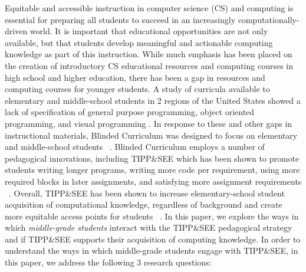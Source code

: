 \documentclass[sigconf,manuscript,review,anonymous]{acmart} %
\def\ts{TIPP\&SEE}
\newcommand{\Scratchencore}[0]{Blinded Curriculum}
\begin{document}
Equitable and accessible instruction in computer science (CS) and computing is essential for preparing all students to succeed in an increasingly computationally-driven world. It is important that educational opportunities are not only available, but that students develop meaningful and actionable computing knowledge as part of this instruction. While much emphasis has been placed on the creation of introductory CS educational resources and computing courses in high school and higher education, there has been a gap in resources and computing courses for younger students. %
A study of curricula available to elementary and middle-school students in 2 regions of the United States showed a lack of specification of general purpose programming, object oriented programming, and visual programming \cite{falkner2019international}. In response to these and other gaps in instructional materials, \Scratchencore{} was designed to focus on elementary and middle-school students ~\cite{authors}. \Scratchencore{} employs a number of pedagogical innovations, including \ts{} which has been shown to promote students writing longer programs, writing more code per requirement, using more required blocks in later assignments, and satisfying more assignment requirements ~\cite{10.1145/3372782.3406257}. Overall, \ts{} has been shown to increase elementary-school student acquisition of computational knowledge, regardless of background and create more equitable access points for students ~\cite{10.1145/3372782.3406257}. In this paper, we explore the ways in which \emph{middle-grade students} interact with the \ts{} pedagogical strategy and if \ts{} supports their acquisition of computing knowledge. In order to understand the ways in which middle-grade students engage with \ts{}, in this paper, we address the following 3 research questions: 
\end{document}
